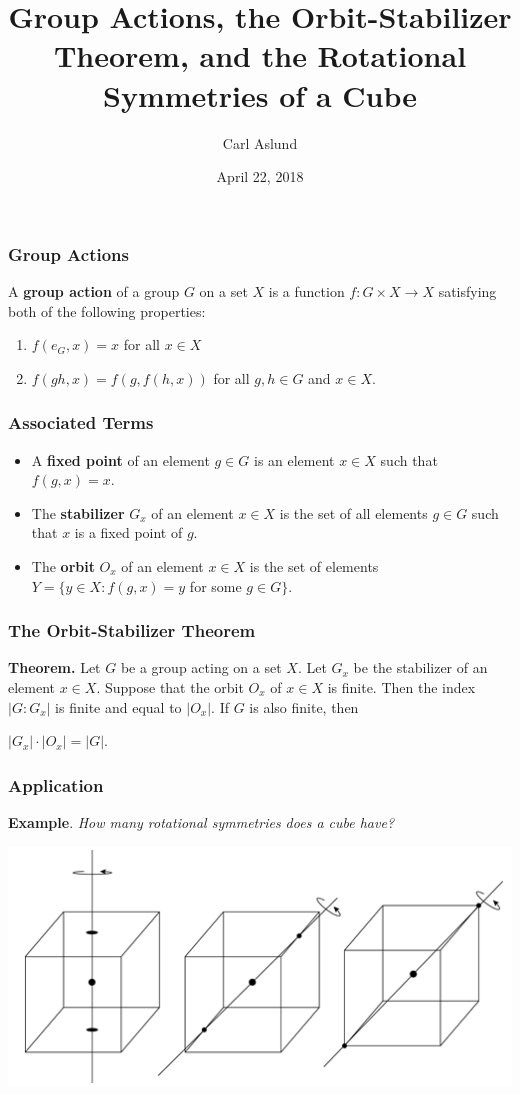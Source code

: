 \documentclass{beamer}
\title{Group Actions, the Orbit-Stabilizer Theorem, and the Rotational Symmetries of a Cube}
\author{Carl Aslund}
\date{April 22, 2018}
\begin{document}
\maketitle
\begin{frame}
	\frametitle{Group Actions}
	A \textbf{group action} of a group $G$ on a set $X$ is a function $f:G \times X \rightarrow X$ satisfying both of the following properties:
	
	\begin{enumerate}
		\item $f(e_G, x)=x$ for all $x \in X$
		\item $f(gh, x)=f(g,f(h,x))$ for all $g,h \in G$ and $x \in X$.
	\end{enumerate}
\end{frame}

\begin{frame}
	\frametitle{Associated Terms}
	\begin{itemize}
		\item A \textbf{fixed point} of an element $g \in G$ is an element $x \in X$ such that $f(g,x)=x$.
		\item The \textbf{stabilizer} $G_x$ of an element $x \in X$ is the set of all elements $g \in G$ such that $x$ is a fixed point of $g$.
		\item The \textbf{orbit} $O_x$ of an element $x \in X$ is the set of elements $Y=\{y \in X : f(g,x)=y$ for some $g \in G\}$.
	\end{itemize}
\end{frame}

\begin{frame}
	\frametitle{The Orbit-Stabilizer Theorem}
	\textbf{Theorem.} Let $G$ be a group acting on a set $X$. Let $G_x$ be the stabilizer of an element $x \in X$. Suppose that the orbit $O_x$ of $x \in X$ is finite. Then the index $|G:G_x|$ is finite and equal to $|O_x|$.  If $G$ is also finite, then
	\begin{center}
		$|G_x| \cdot |O_x| = |G|$.
	\end{center}
\end{frame}

\begin{frame}
	\frametitle{Application}
	\textbf{Example}. \textit{How many rotational symmetries does a cube have?}
	
	\bigskip

	\includegraphics[scale=0.75]{cube-symmetries.jpg}
\end{frame}
\end{document}
